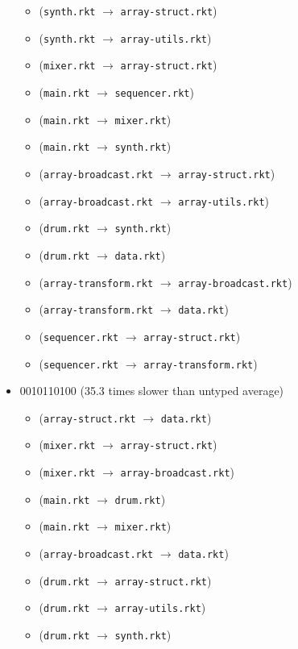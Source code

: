 \documentclass{article}
\newcommand{\mono}[1]{\texttt{#1}}
\begin{document}
\begin{itemize}
\begin{itemize}
  \item (\mono{synth.rkt} $\rightarrow$ \mono{array-struct.rkt})
  \item (\mono{synth.rkt} $\rightarrow$ \mono{array-utils.rkt})
  \item (\mono{mixer.rkt} $\rightarrow$ \mono{array-struct.rkt})
  \item (\mono{main.rkt} $\rightarrow$ \mono{sequencer.rkt})
  \item (\mono{main.rkt} $\rightarrow$ \mono{mixer.rkt})
  \item (\mono{main.rkt} $\rightarrow$ \mono{synth.rkt})
  \item (\mono{array-broadcast.rkt} $\rightarrow$ \mono{array-struct.rkt})
  \item (\mono{array-broadcast.rkt} $\rightarrow$ \mono{array-utils.rkt})
  \item (\mono{drum.rkt} $\rightarrow$ \mono{synth.rkt})
  \item (\mono{drum.rkt} $\rightarrow$ \mono{data.rkt})
  \item (\mono{array-transform.rkt} $\rightarrow$ \mono{array-broadcast.rkt})
  \item (\mono{array-transform.rkt} $\rightarrow$ \mono{data.rkt})
  \item (\mono{sequencer.rkt} $\rightarrow$ \mono{array-struct.rkt})
  \item (\mono{sequencer.rkt} $\rightarrow$ \mono{array-transform.rkt})
  \end{itemize}
\item 0010110100 (35.3 times slower than untyped average)
  \begin{itemize}
  \item (\mono{array-struct.rkt} $\rightarrow$ \mono{data.rkt})
  \item (\mono{mixer.rkt} $\rightarrow$ \mono{array-struct.rkt})
  \item (\mono{mixer.rkt} $\rightarrow$ \mono{array-broadcast.rkt})
  \item (\mono{main.rkt} $\rightarrow$ \mono{drum.rkt})
  \item (\mono{main.rkt} $\rightarrow$ \mono{mixer.rkt})
  \item (\mono{array-broadcast.rkt} $\rightarrow$ \mono{data.rkt})
  \item (\mono{drum.rkt} $\rightarrow$ \mono{array-struct.rkt})
  \item (\mono{drum.rkt} $\rightarrow$ \mono{array-utils.rkt})
  \item (\mono{drum.rkt} $\rightarrow$ \mono{synth.rkt})

\end{itemize}
\end{itemize}
\end{document}
